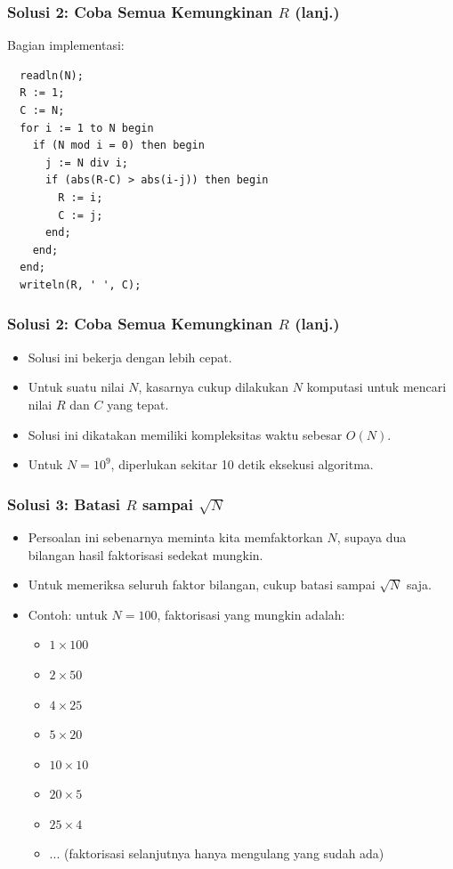 \begin{frame}[fragile]
\frametitle{Solusi 2: Coba Semua Kemungkinan $R$ (lanj.)}
Bagian implementasi:
\begin{lstlisting}
  readln(N);
  R := 1;
  C := N;
  for i := 1 to N begin
    if (N mod i = 0) then begin
      j := N div i;
      if (abs(R-C) > abs(i-j)) then begin
        R := i;
        C := j;
      end;
    end;
  end;
  writeln(R, ' ', C);
\end{lstlisting}
\end{frame}

\begin{frame}[fragile]
\frametitle{Solusi 2: Coba Semua Kemungkinan $R$ (lanj.)}
\begin{itemize}
  \item Solusi ini bekerja dengan lebih cepat.
  \item Untuk suatu nilai $N$, kasarnya cukup dilakukan $N$ komputasi untuk mencari nilai $R$ dan $C$ yang tepat.
  \item Solusi ini dikatakan memiliki kompleksitas waktu sebesar $O(N)$.
  \item Untuk $N = 10^9$, diperlukan sekitar 10 detik eksekusi algoritma.
\end{itemize}
\end{frame}

\begin{frame}[fragile]
\frametitle{Solusi 3: Batasi $R$ sampai $\sqrt{N}$}
\begin{itemize}
  \item Persoalan ini sebenarnya meminta kita memfaktorkan $N$, supaya dua bilangan hasil faktorisasi sedekat mungkin.
  \item Untuk memeriksa seluruh faktor bilangan, cukup batasi sampai $\sqrt{N}$ saja.
  \item Contoh: untuk $N = 100$, faktorisasi yang mungkin adalah:
  \begin{itemize}
    \item $1 \times 100$
    \item $2 \times 50$
    \item $4 \times 25$
    \item $5 \times 20$
    \item $10 \times 10$
    \item $20 \times 5$
    \item $25 \times 4$
    \item $...$ (faktorisasi selanjutnya hanya mengulang yang sudah ada)
  \end{itemize}
\end{itemize}
\end{frame}

